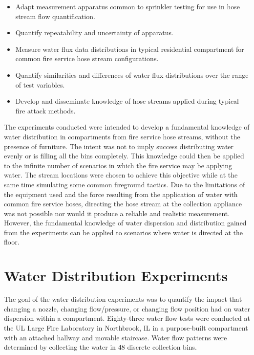 \documentclass[12pt,oneside]{book}
\begin{document}
\begin{itemize}
	\setlength{\itemindent}{0.25in}
	\item Adapt measurement apparatus common to sprinkler testing for use in hose stream flow quantification.
	\item Quantify repeatability and uncertainty of apparatus.
	\item Measure water flux data distributions in typical residential compartment for common fire service hose stream configurations.
	\item Quantify similarities and differences of water flux distributions over the range of test variables.
	\item Develop and disseminate knowledge of hose streams applied during typical fire attack methods.
	\end{itemize}

The experiments conducted were intended to develop a fundamental knowledge of water distribution in compartments from fire service hose streams, without the presence of furniture. The intent was not to imply success distributing water evenly or is filling all the bins completely.  This knowledge could then be applied to the infinite number of scenarios in which the fire service may be applying water. The stream locations were chosen to achieve this objective while at the same time simulating some common fireground tactics. Due to the limitations of the equipment used and the force resulting from the application of water with common fire service hoses, directing the hose stream at the collection appliance was not possible nor would it produce a reliable and realistic measurement. However, the fundamental knowledge of water dispersion and distribution gained from the experiments can be applied to scenarios where water is directed at the floor.



\chapter{Water Distribution Experiments}

The goal of the water distribution experiments was to quantify the impact that changing a nozzle, changing flow/pressure, or changing flow position had on water dispersion within a compartment. Eighty-three water flow tests were conducted at the UL Large Fire Laboratory in Northbrook, IL in a purpose-built compartment with an attached hallway and movable staircase. Water flow patterns were determined by collecting the water in 48 discrete collection bins.
\end{document}
